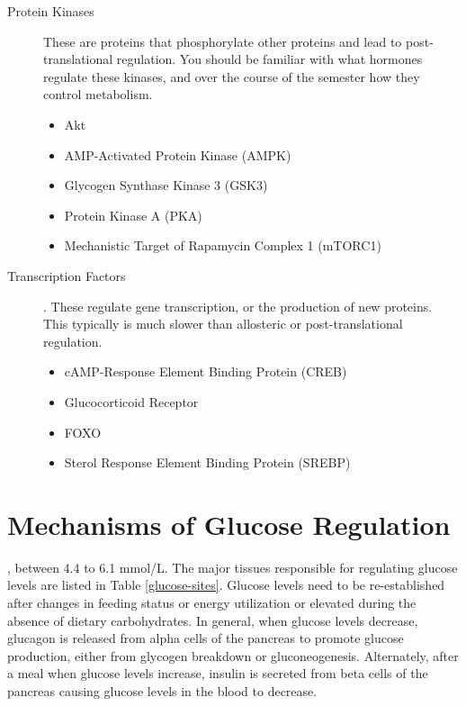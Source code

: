 \documentclass{tufte-handout}
\begin{document}
\begin{description}
	\item [Protein Kinases] These are proteins that phosphorylate other proteins and lead to post-translational regulation.  You should be familiar with what hormones regulate these kinases, and over the course of the semester how they control metabolism.
	\begin{itemize}
		\item Akt
		\item AMP-Activated Protein Kinase (AMPK)
		\item Glycogen Synthase Kinase 3 (GSK3)
		\item Protein Kinase A (PKA)
		\item Mechanistic Target of Rapamycin Complex 1 (mTORC1)
	\end{itemize}
	\item [Transcription Factors].  These regulate gene transcription, or the production of new proteins.  This typically is much slower than allosteric or post-translational regulation.
		\begin{itemize} 
			\item cAMP-Response Element Binding Protein (CREB)
			\item Glucocorticoid Receptor
			\item FOXO
			\item Sterol Response Element Binding Protein (SREBP)
		\end{itemize}
\end{description}


\section{Mechanisms of Glucose Regulation}

, between 4.4 to 6.1 mmol/L.  The major tissues responsible for regulating glucose levels are listed in Table \ref{glucose-sites}. Glucose levels need to be re-established after changes in feeding status or energy utilization or elevated during the absence of dietary carbohydrates.  In general, when glucose levels decrease, glucagon is released from alpha cells of the pancreas to promote glucose production, either from glycogen breakdown or gluconeogenesis.  Alternately, after a meal when glucose levels increase, insulin is secreted from beta cells of the pancreas causing glucose levels in the blood to decrease.
\end{document}
